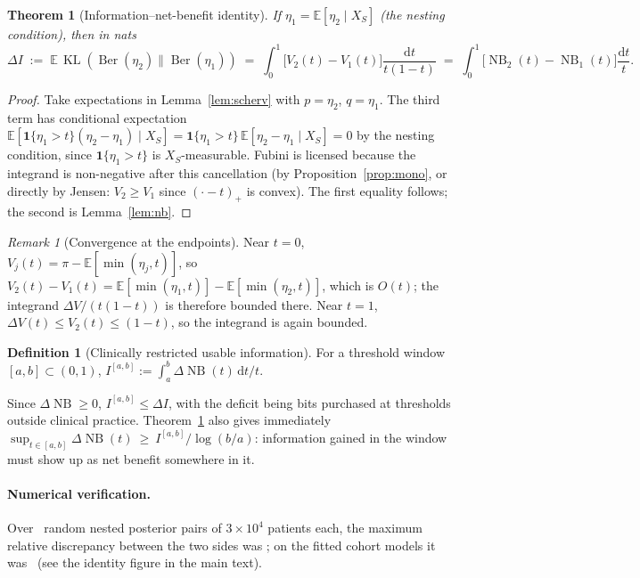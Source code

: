 \documentclass[11pt]{article}
\newtheorem{theorem}{Theorem}
\theoremstyle{definition}
\newtheorem{definition}{Definition}
\theoremstyle{remark}
\newtheorem{remark}{Remark}
\DeclareMathOperator{\KL}{KL}
\DeclareMathOperator{\NB}{NB}
\DeclareMathOperator{\Ber}{Ber}
\newcommand{\E}{\mathbb{E}}
\begin{document}
\begin{theorem}[Information--net-benefit identity]
\label{thm:s-identity}
If $\eta_1=\E[\eta_2\mid X_S]$ (the nesting condition), then in nats
\[
\Delta I \;:=\; \E\,\KL(\Ber(\eta_2)\|\Ber(\eta_1))
\;=\;\int_0^1\big[V_2(t)-V_1(t)\big]\frac{\mathrm{d}t}{t(1-t)}
\;=\;\int_0^1\big[\NB_2(t)-\NB_1(t)\big]\frac{\mathrm{d}t}{t}.
\]
\end{theorem}

\begin{proof}
Take expectations in Lemma~\ref{lem:scherv} with $p=\eta_2$, $q=\eta_1$. The
third term has conditional expectation
$\E[\mathbf 1\{\eta_1>t\}(\eta_2-\eta_1)\mid X_S]=\mathbf 1\{\eta_1>t\}\,
\E[\eta_2-\eta_1\mid X_S]=0$ by the nesting condition, since
$\mathbf 1\{\eta_1>t\}$ is $X_S$-measurable. Fubini is licensed because the
integrand is non-negative after this cancellation (by
Proposition~\ref{prop:mono}, or directly by Jensen: $V_2\ge V_1$ since
$(\cdot-t)_+$ is convex). The first equality follows; the second is
Lemma~\ref{lem:nb}.
\end{proof}

\begin{remark}[Convergence at the endpoints]
Near $t=0$, $V_j(t)=\pi-\E[\min(\eta_j,t)]$, so
$V_2(t)-V_1(t)=\E[\min(\eta_1,t)]-\E[\min(\eta_2,t)]$, which is $O(t)$; the
integrand $\Delta V/(t(1-t))$ is therefore bounded there. Near $t=1$,
$\Delta V(t)\le V_2(t)\le (1-t)$, so the integrand is again bounded.
\end{remark}

\begin{definition}[Clinically restricted usable information]
For a threshold window $[a,b]\subset(0,1)$,
$I^{[a,b]}:=\int_a^b \Delta\NB(t)\,\mathrm{d}t/t$.
\end{definition}

Since $\Delta\NB\ge0$, $I^{[a,b]}\le\Delta I$, with the deficit being bits
purchased at thresholds outside clinical practice. Theorem~\ref{thm:s-identity}
also gives immediately
$\sup_{t\in[a,b]}\Delta\NB(t)\ \ge\ I^{[a,b]}/\log(b/a)$: information gained in
the window must show up as net benefit somewhere in it.

\paragraph{Numerical verification.} Over \thyIdentityTrials\ random nested
posterior pairs of $3\times10^4$ patients each, the maximum relative discrepancy
between the two sides was \thyIdentityRelErr; on the fitted cohort models it was
\primaryIdentityRelErr\ (see the identity figure in the main text).
\end{document}
